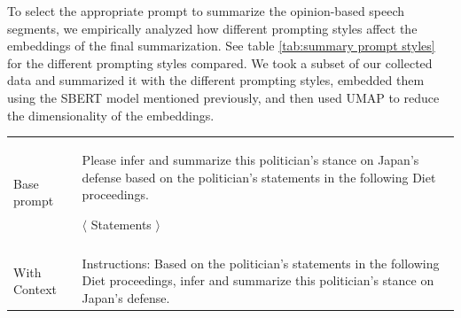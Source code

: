 \documentclass[final,5p,times,twocolumn,authoryear]{elsarticle}
\begin{document}
To select the appropriate prompt to summarize the opinion-based speech segments, we empirically analyzed how different prompting styles affect the embeddings of the final summarization. See table \ref{tab:summary prompt styles} for the different prompting styles compared. We took a subset of our collected data and summarized it with the different prompting styles, embedded them using the SBERT model mentioned previously, and then used UMAP\citep{mcinnes2018umap-software} to reduce the dimensionality of the embeddings. 

\begin{table}[htbp] %
\centering

\begin{tabularx}{.45\textwidth}{ p{1.7cm}|X } 
\hline
Base prompt & Please infer and summarize this politician's stance on Japan's defense based on the politician's statements in the following Diet proceedings. 
\newline

$\langle$ Statements $\rangle$ \\\\  
\hline
With Context & Instructions:
\newline
Based on the politician's statements in the following Diet proceedings, infer and summarize this politician's stance on Japan's defense. 
\newline


\end{tabularx}
\end{table}
\end{document}
